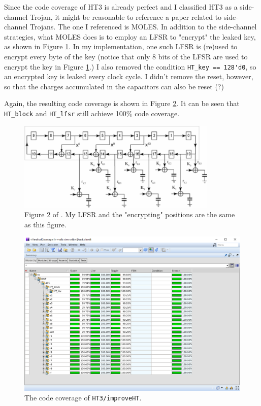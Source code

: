 \documentclass{article}
\begin{document}
Since the code coverage of HT3 is already perfect and I classified HT3 as a side-channel Trojan, it might be reasonable to reference a paper related to side-channel Trojans. The one I referenced is MOLES. \cite{5361303} In addition to the side-channel strategies, what MOLES does is to employ an LFSR to "encrypt" the leaked key, as shown in Figure \ref{MOLES_LFSR}. In my implementation, one such LFSR is (re)used to encrypt every byte of the key (notice that only 8 bits of the LFSR are used to encrypt the key in Figure \ref{MOLES_LFSR}.) I also removed the condition \verb|HT_key == 128'd0|, so an encrypted key is leaked every clock cycle. I didn't remove the reset, however, so that the charges accumulated in the capacitors can also be reset (?)

Again, the resulting code coverage is shown in Figure \ref{improveHT3}. It can be seen that \verb|HT_block| and \verb|HT_lfsr| still achieve 100\% code coverage.

\begin{figure}[h] \centering
\includegraphics[width=0.85\textwidth]{MOLES_LFSR}
\caption{Figure 2 of \cite{5361303}. My LFSR and the "encrypting" positions are the same as this figure.}
\label{MOLES_LFSR}
\end{figure}

\begin{figure}[ht] \centering
\includegraphics[width=\textwidth]{improveHT3}
\caption{The code coverage of \texttt{HT3/improveHT}.}
\label{improveHT3}
\end{figure}
\end{document}

